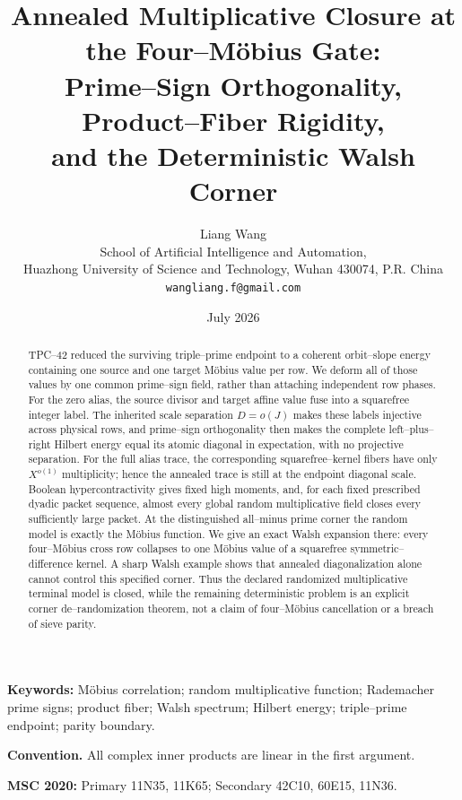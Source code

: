 \documentclass[11pt]{article}
\title{\bfseries Annealed Multiplicative Closure at the Four--M\"obius Gate:\\
Prime--Sign Orthogonality, Product--Fiber Rigidity,\\
and the Deterministic Walsh Corner}
\author{Liang Wang\\
\small School of Artificial Intelligence and Automation,\\[-2pt]
\small Huazhong University of Science and Technology, Wuhan 430074, P.R. China\\
\small \texttt{wangliang.f@gmail.com}}
\date{July 2026}
\theoremstyle{definition}
\theoremstyle{remark}
\begin{document}
\maketitle

\begin{abstract}
TPC--42 reduced the surviving triple--prime endpoint to a coherent
orbit--slope energy containing one source and one target M\"obius value
per row.  We deform all of those values by one common prime--sign field,
rather than attaching independent row phases.  For the zero alias, the
source divisor and target affine value fuse into a squarefree integer
label.  The inherited scale separation $D=o(J)$ makes these labels
injective across physical rows, and prime--sign orthogonality then makes
the complete left--plus--right Hilbert energy equal its atomic diagonal
in expectation, with no projective separation.  For the full alias trace,
the corresponding squarefree--kernel fibers have only $X^{o(1)}$
multiplicity; hence the annealed trace is still at the endpoint diagonal
scale.  Boolean hypercontractivity gives fixed high moments, and, for
each fixed prescribed dyadic packet sequence, almost every global random
multiplicative field closes every sufficiently large packet.  At the
distinguished all--minus prime corner the random
model is exactly the M\"obius function.  We give an exact Walsh expansion
there: every four--M\"obius cross row collapses to one M\"obius value of a
squarefree symmetric--difference kernel.  A sharp Walsh example shows
that annealed diagonalization alone cannot control this specified corner.
Thus the declared randomized multiplicative terminal model is closed,
while the remaining
deterministic problem is an explicit corner de--randomization theorem,
not a claim of four--M\"obius cancellation or a breach of sieve parity.
\end{abstract}

\noindent\textbf{Keywords:} M\"obius correlation; random multiplicative
function; Rademacher prime signs; product fiber; Walsh spectrum; Hilbert
energy; triple--prime endpoint; parity boundary.

\medskip
\noindent\textbf{Convention.}
All complex inner products are linear in the first argument.

\medskip
\noindent\textbf{MSC 2020:} Primary 11N35, 11K65; Secondary 42C10,
60E15, 11N36.














\begingroup
\small
\setlength{\bibsep}{4pt plus 1pt minus 1pt}


\endgroup
\end{document}
